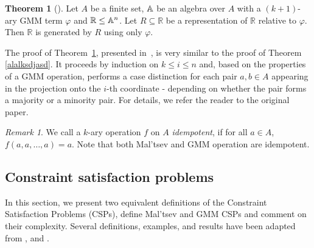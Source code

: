 \documentclass{article}
\newcommand{\A}{\ensuremath\mathbb{A}}
\newcommand{\R}{\mathbb{R}}
\theoremstyle{definition}
\theoremstyle{theorem}
\newtheorem{thm}{Theorem}
\theoremstyle{theorem}
\theoremstyle{remark}
\theoremstyle{remark}
\newtheorem{rem}{Remark}
\theoremstyle{example}
\theoremstyle{notation}
\theoremstyle{theorem}
\begin{document}
\begin{thm}[\cite{lmcs:2237}]\label{(()()DJKGSKGLdlkjh}
Let $A$ be a finite set, $\A$ be an algebra over $A$ with a $(k+1)$-ary GMM term $\varphi$ and $\R \leq \A^n$. Let $R\subseteq \R$ be a representation of $\R$ relative to $\varphi$. Then $\R$ is generated by $R$ using only $\varphi$.
\end{thm}
The proof of Theorem~\ref{(()()DJKGSKGLdlkjh}, presented in~\cite{lmcs:2237}, is very similar to the proof of Theorem \ref{alalksdjasd}. It proceeds by induction on $k \leq i \leq n$ and, based on the properties of a GMM operation, performs a case distinction for each pair $a, b \in A$ appearing in the projection onto the $i$-th coordinate - depending on whether the pair forms a majority or a minority pair. For details, we refer the reader to the original paper. 

\begin{rem}\label{alkdshfg;asgh}
  We call a $k$-ary operation $f$ on $A$ \emph{idempotent}, if for all $a\in A$, $f(a,a,\ldots,a) = a$. Note that both Mal'tsev and GMM operation are idempotent. 
\end{rem}




\subsection{Constraint satisfaction problems}\label{as;ldhkgf;}

In this section, we present two equivalent definitions of the Constraint Satisfaction Problems (CSPs), define Mal'tsev and GMM CSPs and comment on their complexity. Several definitions, examples, and results have been adapted from \cite{barto_et_al}, \cite{doi:10.1137/050628957} and \cite{https://doi.org/10.48550/arxiv.2210.07383}.
\end{document}
